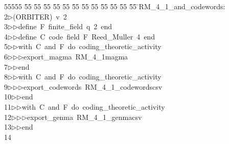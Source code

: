 %
%
\begin{tabbing}
55555 \= 55 \= 55 \= 55 \= 55 \= 55 \= 55 \= 55 \= 55 \= 55 \= 55 \= 55 \= 55 \= \>RM\_4\_1\_and\_codewords:\\[0pt]
2\>$\triangleright$\>(ORBITER)\ v\ 2\ \\[0pt]
3\>$\triangleright$\>$\triangleright$\>define\ F\ finite\_field\ q\ 2\ end\ \\[0pt]
4\>$\triangleright$\>$\triangleright$\>define\ C\ code\ field\ F\ Reed\_Muller\ 4\ end\ \\[0pt]
5\>$\triangleright$\>$\triangleright$\>with\ C\ and\ F\ do\ coding\_theoretic\_activity\ \\[0pt]
6\>$\triangleright$\>$\triangleright$\>$\triangleright$\>export\_magma\ RM\_4\_1magma\ \\[0pt]
7\>$\triangleright$\>$\triangleright$\>end\ \\[0pt]
8\>$\triangleright$\>$\triangleright$\>with\ C\ and\ F\ do\ coding\_theoretic\_activity\ \\[0pt]
9\>$\triangleright$\>$\triangleright$\>$\triangleright$\>export\_codewords\ RM\_4\_1\_codewordscsv\ \\[0pt]
10\>$\triangleright$\>$\triangleright$\>end\ \\[0pt]
11\>$\triangleright$\>$\triangleright$\>with\ C\ and\ F\ do\ coding\_theoretic\_activity\ \\[0pt]
12\>$\triangleright$\>$\triangleright$\>$\triangleright$\>export\_genma\ RM\_4\_1\_genmacsv\ \\[0pt]
13\>$\triangleright$\>$\triangleright$\>end\ \\[0pt]
14\>\end{tabbing}
